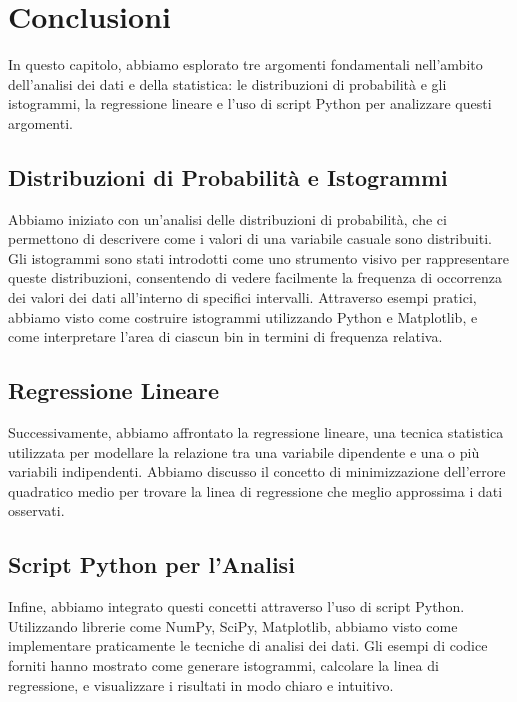 \section{Conclusioni}

In questo capitolo, abbiamo esplorato tre argomenti fondamentali nell'ambito dell'analisi dei dati e della statistica: le distribuzioni di probabilità e gli istogrammi, la regressione lineare e l'uso di script Python per analizzare questi argomenti. 

\subsection{Distribuzioni di Probabilità e Istogrammi}

Abbiamo iniziato con un'analisi delle distribuzioni di probabilità, che ci permettono di descrivere come i valori di una variabile casuale sono distribuiti. Gli istogrammi sono stati introdotti come uno strumento visivo per rappresentare queste distribuzioni, consentendo di vedere facilmente la frequenza di occorrenza dei valori dei dati all'interno di specifici intervalli. Attraverso esempi pratici, abbiamo visto come costruire istogrammi utilizzando Python e Matplotlib, e come interpretare l'area di ciascun bin in termini di frequenza relativa.

\subsection{Regressione Lineare}

Successivamente, abbiamo affrontato la regressione lineare, una tecnica statistica utilizzata per modellare la relazione tra una variabile dipendente e una o più variabili indipendenti. Abbiamo discusso il concetto di minimizzazione dell'errore quadratico medio per trovare la linea di regressione che meglio approssima i dati osservati. 

\subsection{Script Python per l'Analisi}

Infine, abbiamo integrato questi concetti attraverso l'uso di script Python. Utilizzando librerie come NumPy, SciPy, Matplotlib, abbiamo visto come implementare praticamente le tecniche di analisi dei dati. Gli esempi di codice forniti hanno mostrato come generare istogrammi, calcolare la linea di regressione, e visualizzare i risultati in modo chiaro e intuitivo.

